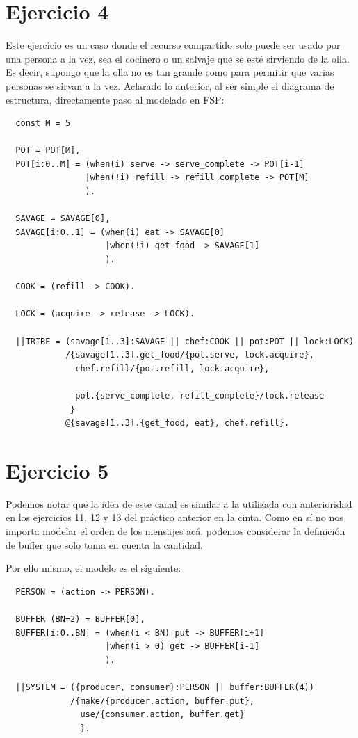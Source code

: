 \documentclass{article}
\begin{document}
\section*{Ejercicio 4}
Este ejercicio es un caso donde el recurso compartido solo puede ser usado por una persona a la vez, sea el cocinero o un salvaje que se esté sirviendo de la olla.
Es decir, supongo que la olla no es tan grande como para permitir que varias personas se sirvan a la vez.
Aclarado lo anterior, al ser simple el diagrama de estructura, directamente paso al modelado en FSP:
\begin{verbatim}
  const M = 5

  POT = POT[M],
  POT[i:0..M] = (when(i) serve -> serve_complete -> POT[i-1]
                |when(!i) refill -> refill_complete -> POT[M]
                ).

  SAVAGE = SAVAGE[0],
  SAVAGE[i:0..1] = (when(i) eat -> SAVAGE[0]
                    |when(!i) get_food -> SAVAGE[1]
                    ).

  COOK = (refill -> COOK).

  LOCK = (acquire -> release -> LOCK).

  ||TRIBE = (savage[1..3]:SAVAGE || chef:COOK || pot:POT || lock:LOCK)
            /{savage[1..3].get_food/{pot.serve, lock.acquire},
              chef.refill/{pot.refill, lock.acquire},

              pot.{serve_complete, refill_complete}/lock.release
             }
            @{savage[1..3].{get_food, eat}, chef.refill}.
\end{verbatim}

\section*{Ejercicio 5}
Podemos notar que la idea de este canal es similar a la utilizada con anterioridad en los ejercicios 11, 12 y 13 del práctico anterior en la cinta.
Como en sí no nos importa modelar el orden de los mensajes acá, podemos considerar la definición de buffer que solo toma en cuenta la cantidad.

Por ello mismo, el modelo es el siguiente:
\begin{verbatim}
  PERSON = (action -> PERSON).

  BUFFER (BN=2) = BUFFER[0],
  BUFFER[i:0..BN] = (when(i < BN) put -> BUFFER[i+1]
                    |when(i > 0) get -> BUFFER[i-1]
                    ).

  ||SYSTEM = ({producer, consumer}:PERSON || buffer:BUFFER(4))
             /{make/{producer.action, buffer.put},
               use/{consumer.action, buffer.get}
               }.
\end{verbatim}
\end{document}
